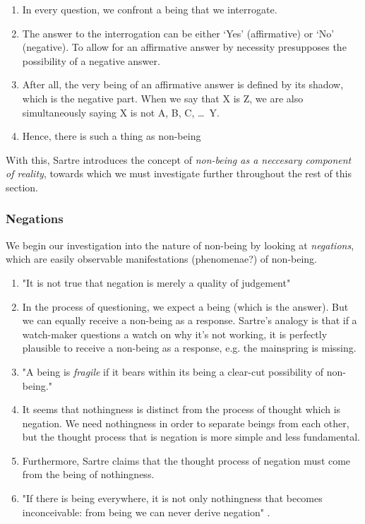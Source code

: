 \begin{enumerate}
  \item In every question, we confront a being that we interrogate.
  \item The answer to the interrogation can be either `Yes' (affirmative) or `No' (negative). To allow for an affirmative answer by necessity presupposes the possibility of a negative answer.
  \item After all, the very being of an affirmative answer is defined by its shadow, which is the negative part. When we say that X is Z, we are also simultaneously saying X is not A, B, C, \ldots\ Y.
  \item Hence, there is such a thing as non-being
\end{enumerate}

\noindent
With this, Sartre introduces the concept of \emph{non-being as a neccesary component of reality}, towards which we must investigate further throughout the rest of this section.

\subsubsection{Negations}
We begin our investigation into the nature of non-being by looking at \emph{negations}, which are easily observable manifestations (phenomenae?) of non-being.

\begin{enumerate}
  \item "It is not true that negation is merely a quality of judgement" \autocite[38]{sartre}
  \item In the process of questioning, we expect a being (which is the answer). But we can equally receive a non-being as a response. Sartre's analogy is that if a watch-maker questions a watch on why it's not working, it is perfectly plausible to receive a non-being as a response, e.g. the mainspring is missing.
  \item "A being is \emph{fragile} if it bears within its being a clear-cut possibility of non-being." \autocite[40]{sartre}
  \item It seems that nothingness is distinct from the process of thought which is negation. We need nothingness in order to separate beings from each other, but the thought process that is negation is more simple and less fundamental.
  \item Furthermore, Sartre claims that the thought process of negation must come from the being of nothingness.
  \item "If there is being everywhere, it is not only nothingness that becomes inconceivable: from being we can never derive negation" \autocite[44]{sartre}.
\end{enumerate}

